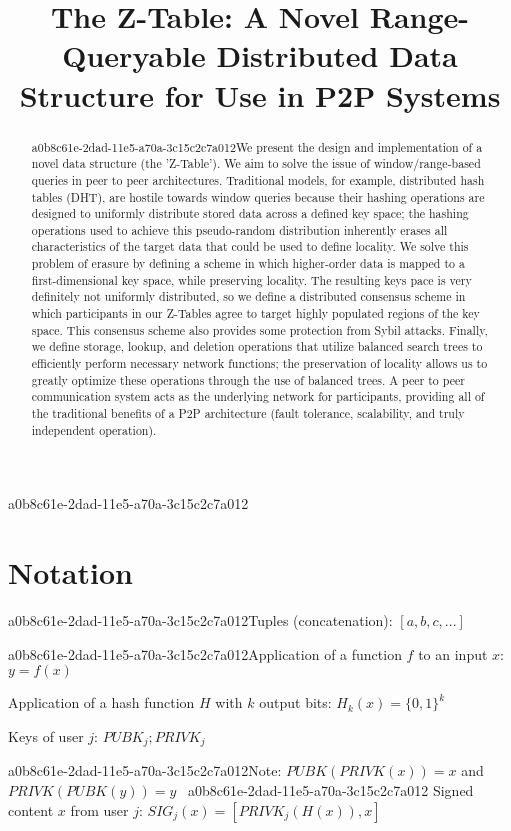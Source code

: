 \documentclass[12pt]{article}
\title{The Z-Table: A Novel Range-Queryable Distributed Data Structure for Use in P2P Systems}
\begin{document}
\maketitle

a0b8c61e-2dad-11e5-a70a-3c15c2c7a012\begin{abstract}
a0b8c61e-2dad-11e5-a70a-3c15c2c7a012We present the design and implementation of a novel data structure (the 'Z-Table'). We aim to solve the issue of window/range-based queries in peer to peer architectures. Traditional models, for example,  distributed hash tables (DHT), are hostile towards window queries because their hashing operations are designed to uniformly distribute stored data across a defined key space; the hashing operations used to achieve this pseudo-random distribution inherently erases all characteristics of the target data that could be used to define locality. We solve this problem of erasure by defining a scheme in which higher-order data is mapped to a first-dimensional key space, while preserving locality. The resulting keys pace is very definitely not uniformly distributed, so we define a distributed consensus scheme in which participants in our Z-Tables agree to target highly populated regions of the key space. This consensus scheme also provides some protection from Sybil attacks. Finally, we define storage, lookup, and deletion operations that utilize balanced search trees to efficiently perform necessary network functions; the preservation of locality allows us to greatly optimize these operations through the use of balanced trees. A peer to peer communication system acts as the underlying network for participants, providing all of the traditional benefits of a P2P architecture (fault tolerance, scalability, and truly independent operation).
\end{abstract}

\section{Notation}

a0b8c61e-2dad-11e5-a70a-3c15c2c7a012Tuples (concatenation): $[a,b,c,...]$

a0b8c61e-2dad-11e5-a70a-3c15c2c7a012Application of a function $f$ to an input $x$: $y=f(x)$

Application of a hash function $H$ with $k$ output bits: $H_{k}(x) = \{0,1\}^k$

Keys of user $j$: $ PUBK_j; PRIVK_j $

a0b8c61e-2dad-11e5-a70a-3c15c2c7a012Note: $PUBK(PRIVK(x)) = x$ and $PRIVK(PUBK(y)) = y$~
a0b8c61e-2dad-11e5-a70a-3c15c2c7a012
Signed content $x$ from user $j$: $SIG_j(x) = \left[ PRIVK_j( H(x) ), x \right]$
\end{document}
